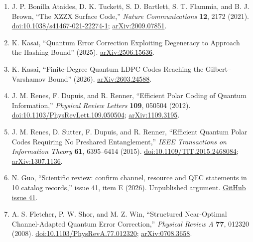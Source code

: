 \begin{enumerate}[label={},leftmargin=4.8em,labelsep=0.5em]
  \footnotesize
  \item[\textup{[BAT+21]}]\label{ref:p6-xzzx}
  J. P. Bonilla Ataides, D. K. Tuckett, S. D. Bartlett, S. T. Flammia, and
  B. J. Brown, ``The XZZX Surface Code,'' \emph{Nature Communications}
  \textbf{12}, 2172 (2021).
  \href{https://doi.org/10.1038/s41467-021-22274-1}{doi:10.1038/s41467-021-22274-1};
  \href{https://arxiv.org/abs/2009.07851}{arXiv:2009.07851}.

  \item[\textup{[Kas25]}]\label{ref:p6-kasai-degeneracy}
  K. Kasai, ``Quantum Error Correction Exploiting Degeneracy to Approach the
  Hashing Bound'' (2025).\newline
  \href{https://arxiv.org/abs/2506.15636}{arXiv:2506.15636}.

  \item[\textup{[Kas26]}]\label{ref:p6-kasai-gv}
  K. Kasai, ``Finite-Degree Quantum LDPC Codes Reaching the
  Gilbert--Varshamov Bound'' (2026).\newline
  \href{https://arxiv.org/abs/2603.24588}{arXiv:2603.24588}.

  \item[\textup{[RDR12]}]\label{ref:p6-renes-2012}
  J. M. Renes, F. Dupuis, and R. Renner,
  ``Efficient Polar Coding of Quantum Information,''
  \emph{Physical Review Letters} \textbf{109}, 050504 (2012).
  \href{https://doi.org/10.1103/PhysRevLett.109.050504}{doi:10.1103/PhysRevLett.109.050504};
  \href{https://arxiv.org/abs/1109.3195}{arXiv:1109.3195}.

  \item[\textup{[RSDR15]}]\label{ref:p6-renes-2015}
  J. M. Renes, D. Sutter, F. Dupuis, and R. Renner,
  ``Efficient Quantum Polar Codes Requiring No Preshared Entanglement,''
  \emph{IEEE Transactions on Information Theory} \textbf{61}, 6395--6414
  (2015).
  \href{https://doi.org/10.1109/TIT.2015.2468084}{doi:10.1109/TIT.2015.2468084};
  \href{https://arxiv.org/abs/1307.1136}{arXiv:1307.1136}.

  \item[\textup{[Guo26]}]\label{ref:p6-review}
  N. Guo, ``Scientific review: confirm channel, resource and QEC statements
in 10 catalog records,'' issue 41, item E (2026). Unpublished argument.
\href{https://github.com/Naixu-Guo/quantum-open-problems/issues/41}{GitHub issue 41}.

  \item[\textup{[FSW08]}]\label{ref:p6-optimal-recovery}
  A. S. Fletcher, P. W. Shor, and M. Z. Win,
``Structured Near-Optimal Channel-Adapted Quantum Error Correction,''
\emph{Physical Review A} \textbf{77}, 012320 (2008).
\href{https://doi.org/10.1103/PhysRevA.77.012320}{doi:10.1103/PhysRevA.77.012320};
\href{https://arxiv.org/abs/0708.3658}{arXiv:0708.3658}.


\end{enumerate}
